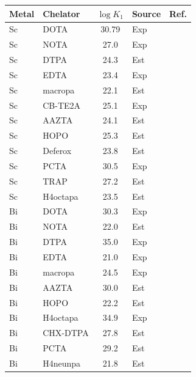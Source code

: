 \documentclass[journal=jacsat,manuscript=suppinfo]{achemso}
\begin{document}
\begin{longtable}{@{}llcp{1.5cm}c@{}}
  \toprule
  Metal & Chelator & $\log K_1$ & Source & Ref. \\
  \midrule
  \endhead
  Sc & DOTA     & 30.79 & Exp & \cite{Pniok2014} \\
  Sc & NOTA     & 27.0  & Exp & \cite{Pniok2014} \\
  Sc & DTPA     & 24.3  & Est & \cite{MartellSmith2004,Hancock1989} \\
  Sc & EDTA     & 23.4  & Exp & \cite{Pniok2014} \\
  Sc & macropa  & 22.1  & Est & \cite{MartellSmith2004,Hancock1989} \\
  Sc & CB-TE2A  & 25.1  & Exp & \cite{Pniok2014} \\
  Sc & AAZTA    & 24.1  & Est & \cite{MartellSmith2004,Hancock1989} \\
  Sc & HOPO     & 25.3  & Est & \cite{MartellSmith2004,Hancock1989} \\
  Sc & Deferox  & 23.8  & Est & \cite{MartellSmith2004,Hancock1989} \\
  Sc & PCTA     & 30.5  & Exp & \cite{Pniok2014} \\
  Sc & TRAP     & 27.2  & Est & \cite{MartellSmith2004,Hancock1989} \\
  Sc & H4octapa & 23.5  & Est & \cite{MartellSmith2004,Hancock1989} \\
  Bi & DOTA     & 30.3  & Exp & \cite{Milne2015} \\
  Bi & NOTA     & 22.0  & Est & \cite{MartellSmith2004,Hancock1989} \\
  Bi & DTPA     & 35.0  & Exp & \cite{Milne2015} \\
  Bi & EDTA     & 21.0  & Exp & \cite{MartellSmith2004} \\
  Bi & macropa  & 24.5  & Exp & \cite{Morgan2023} \\
  Bi & AAZTA    & 30.0  & Est & \cite{MartellSmith2004,Hancock1989} \\
  Bi & HOPO     & 22.2  & Est & \cite{MartellSmith2004,Hancock1989} \\
  Bi & H4octapa & 34.9  & Exp & \cite{Morgan2023} \\
  Bi & CHX-DTPA & 27.8  & Est & \cite{MartellSmith2004,Hancock1989} \\
  Bi & PCTA     & 29.2  & Est & \cite{MartellSmith2004,Hancock1989} \\
  Bi & H4neunpa & 21.8  & Est & \cite{MartellSmith2004,Hancock1989} \\

\end{longtable}
\end{document}
